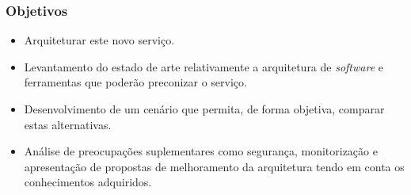 \begin{frame}
    \frametitle{\checkmark \hspace{1mm} Objetivos}
    \begin{itemize}
        \item Arquiteturar este novo serviço.
        \item Levantamento do estado de arte relativamente a arquitetura de
        \textit{software} e ferramentas que poderão preconizar o serviço.
        \item Desenvolvimento de um cenário que permita, de forma objetiva,
        comparar estas alternativas. 
        \item Análise de preocupações suplementares como segurança,
        monitorização e apresentação de propostas de melhoramento da arquitetura
        tendo em conta os conhecimentos adquiridos. 
    \end{itemize}
\end{frame}